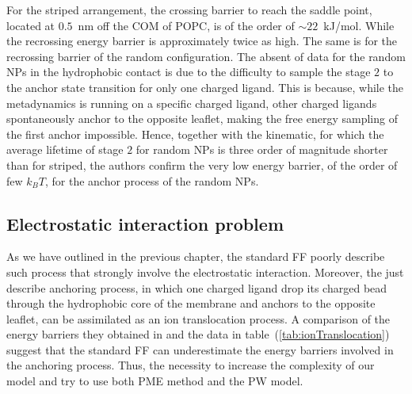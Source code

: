 For the striped arrangement, the crossing barrier to reach the saddle point, located at $0.5$~nm off the \ac{COM} of \ac{POPC}, is of the order of $\sim 22$~kJ/mol. While the recrossing energy barrier is approximately twice as high. The same is for the recrossing barrier of the random configuration. The absent of data for the random \acp{NP} in the hydrophobic contact is due to the difficulty to sample the stage $2$ to the anchor state transition for only one charged ligand. This is because, while the metadynamics is running on a specific charged ligand, other charged ligands spontaneously anchor to the opposite leaflet, making the free energy sampling of the first anchor impossible. Hence, together with the kinematic, for which the average lifetime of stage $2$ for random \acp{NP} is three order of magnitude shorter than for striped, the authors confirm the very low energy barrier, of the order of few $k_B T$, for the anchor process of the random \acp{NP}.


\subsection{Electrostatic interaction problem}
As we have outlined in the previous chapter, the standard \martini \ac{FF} poorly describe such process that strongly involve the electrostatic interaction. Moreover, the just describe anchoring process, in which one charged ligand drop its charged bead through the hydrophobic core of the membrane and anchors to the opposite leaflet, can be assimilated as an ion translocation process. A comparison of the energy barriers they obtained in \cite{ourPaper} and the data in table~(\ref{tab:ionTranslocation}) suggest that the standard \martini \ac{FF} can underestimate the energy barriers involved in the anchoring process. Thus, the necessity to increase the complexity of our model and try to use both \ac{PME} method and the \ac{PW} model. 
